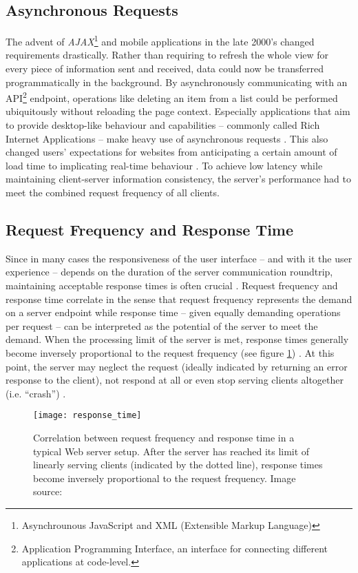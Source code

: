 \subsection{Asynchronous Requests}
The advent of \textit{AJAX}\footnote{Asynchrounous JavaScript and XML (Extensible Markup Language)} and mobile applications in the late 2000's changed requirements drastically. Rather than requiring to refresh the whole view for every piece of information sent and received, data could now be transferred programmatically in the background. By asynchronously communicating with an API\footnote{Application Programming Interface, an interface for connecting different applications at code-level.} endpoint, operations like deleting an item from a list could be performed ubiquitously without reloading the page context. Especially applications that aim to provide desktop-like behaviour and capabilities -- commonly called Rich Internet Applications -- make heavy use of asynchronous requests \cite[p. 4]{Sencha2011}. This also changed users' expectations for websites from anticipating a certain amount of load time to implicating real-time behaviour \cite{Garrett2005}. To achieve low latency while maintaining client-server information consistency, the server's performance had to meet the combined request frequency of all clients.

\subsection{Request Frequency and Response Time}
\label{lab:frequency}
Since in many cases the responsiveness of the user interface -- and with it the user experience -- depends on the duration of the server communication roundtrip, maintaining acceptable response times is often crucial \cite[p. 1]{Nadimpalli2000}. Request frequency and response time correlate in the sense that request frequency represents the demand on a server endpoint while response time -- given equally demanding operations per request -- can be interpreted as the potential of the server to meet the demand. When the processing limit of the server is met, response times generally become inversely proportional to the request frequency (see figure \ref{fig:response_time}) \cite{response_time}. At this point, the server may neglect the request (ideally indicated by returning an error response to the client), not respond at all or even stop serving clients altogether (i.e. ``crash'') \cite{http}.

\begin{figure}
\centering\small
\setlength{\tabcolsep}{0mm}
  \texttt{[image: response\_time]}
\caption{
Correlation between request frequency and response time in a typical Web server setup. After the server has reached its limit of linearly serving clients (indicated by the dotted line), response times become inversely proportional to the request frequency. Image source: \cite{response_time}
}
\label{fig:response_time}
\end{figure}

